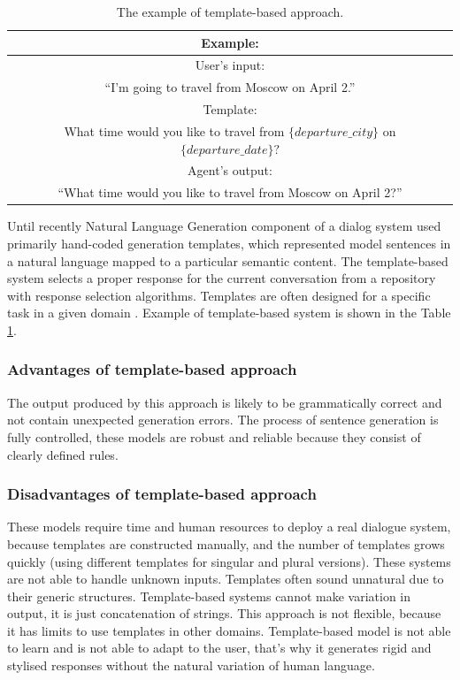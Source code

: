 \begin{table}[ht]
\centering
 \begin{tabular}{|c|} 
 \hline
 Example: \\
 \hline
 User's input: \\
 ``I'm going to travel from Moscow on April 2.'' \\ 
 \hline
 Template: \\
 What time would you like to travel from $\{departure\_city\}$ on $\{departure\_date\}?$ \\
 \hline
 Agent's output:\\
 ``What time would you like to travel from Moscow on April 2?'' \\
 \hline
 \end{tabular}
 \caption{The example of template-based approach.}
\label{tab:tb_example}
\end{table}

Until recently Natural Language Generation component of a dialog system used primarily hand-coded generation templates, which represented model sentences in a natural language mapped to a particular semantic content.
The template-based system selects a proper response for the current conversation from a repository with response selection algorithms. Templates are often designed for a specific task in a given domain \cite{manishina2016data}. 
Example of template-based system is shown in the Table \ref{tab:tb_example}.


\subsubsection{Advantages of template-based approach}
The output produced by this approach is likely to be grammatically correct and not contain unexpected generation errors. The process of sentence generation is fully controlled, these models are robust and reliable because they consist of clearly defined rules. 

\subsubsection{Disadvantages of template-based approach}
These models require time and human resources to deploy a real dialogue system, because templates are constructed manually, and the number of templates grows quickly (using different templates for singular and plural versions). These systems are not able to handle unknown inputs. Templates often sound unnatural due to their generic structures. Template-based systems cannot make variation in output, it is just concatenation of strings. This approach is not flexible, because it has limits to use templates in other domains. Template-based model is not able to learn and is not able to adapt to the user, that's why it generates rigid and stylised responses without the natural variation of human language.


